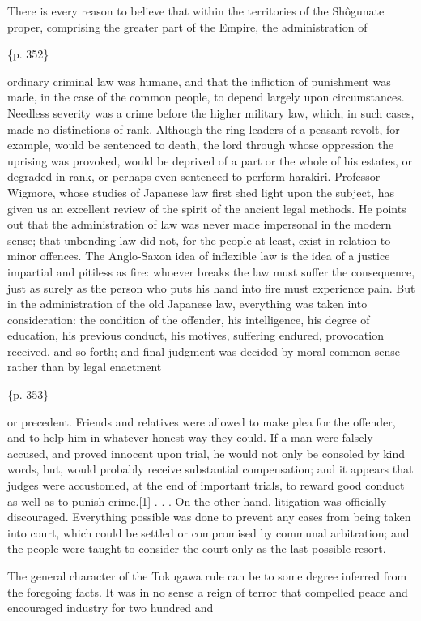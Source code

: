 There is every reason to believe that within the territories of the Shôgunate proper, comprising the greater part of the Empire, the administration of

\{p. 352\}

ordinary criminal law was humane, and that the infliction of punishment was made, in the case of the common people, to depend largely upon circumstances. Needless severity was a crime before the higher military law, which, in such cases, made no distinctions of rank. Although the ring-leaders of a peasant-revolt, for example, would be sentenced to death, the lord through whose oppression the uprising was provoked, would be deprived of a part or the whole of his estates, or degraded in rank, or perhaps even sentenced to perform harakiri. Professor Wigmore, whose studies of Japanese law first shed light upon the subject, has given us an excellent review of the spirit of the ancient legal methods. He points out that the administration of law was never made impersonal in the modern sense; that unbending law did not, for the people at least, exist in relation to minor offences. The Anglo-Saxon idea of inflexible law is the idea of a justice impartial and pitiless as fire: whoever breaks the law must suffer the consequence, just as surely as the person who puts his hand into fire must experience pain. But in the administration of the old Japanese law, everything was taken into consideration: the condition of the offender, his intelligence, his degree of education, his previous conduct, his motives, suffering endured, provocation received, and so forth; and final judgment was decided by moral common sense rather than by legal enactment

\{p. 353\}

or precedent. Friends and relatives were allowed to make plea for the offender, and to help him in whatever honest way they could. If a man were falsely accused, and proved innocent upon trial, he would not only be consoled by kind words, but, would probably receive substantial compensation; and it appears that judges were accustomed, at the end of important trials, to reward good conduct as well as to punish crime.[1] . . . On the other hand, litigation was officially discouraged. Everything possible was done to prevent any cases from being taken into court, which could be settled or compromised by communal arbitration; and the people were taught to consider the court only as the last possible resort.



The general character of the Tokugawa rule can be to some degree inferred from the foregoing facts. It was in no sense a reign of terror that compelled peace and encouraged industry for two hundred and

